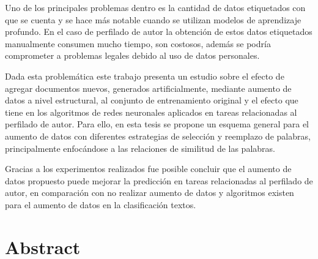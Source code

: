 Uno de los principales problemas dentro es la cantidad de datos etiquetados con que se cuenta y se hace más notable cuando se utilizan modelos de aprendizaje profundo. En el caso de perfilado de autor la obtención de estos datos etiquetados manualmente consumen mucho tiempo, son costosos, además se podría comprometer a problemas legales debido al uso de datos personales. 

Dada esta problemática este trabajo presenta un estudio sobre el efecto de agregar documentos nuevos, generados artificialmente, mediante aumento de datos a nivel estructural, al  conjunto de entrenamiento original y el efecto que tiene en los algoritmos de redes neuronales aplicados en tareas relacionadas al perfilado de autor. Para ello, en esta tesis se propone un esquema general para el aumento de datos con diferentes estrategias de selección y reemplazo de palabras, principalmente enfocándose a las relaciones de similitud de las palabras. 

Gracias a los experimentos realizados fue posible concluir que el aumento de datos propuesto puede mejorar la predicción en tareas relacionadas al perfilado de autor, en comparación con no realizar aumento de datos y algoritmos existen para el aumento de datos en la clasificación textos.

\chapter{Abstract}







